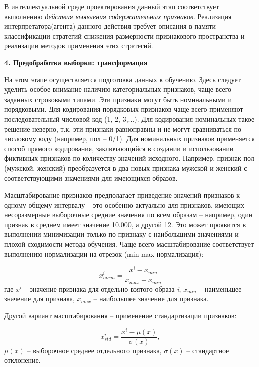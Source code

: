 В интеллектуальной среде проектирования данный этап соответствует выполнению \textit{действия выявления содержательных признаков}. Реализация интерпретатора(агента) данного действия требует описания в памяти классификации стратегий снижения размерности признакового пространства и реализации методов применения этих стратегий. 

\textbf{4. Предобработка выборки: трансформация}

На этом этапе осуществляется подготовка данных к обучению. 
Здесь следует уделить особое внимание наличию категориальных признаков, чаще всего заданных строковыми типами. Эти признаки могут быть номинальными и порядковыми. Для кодирования порядковых признаков чаще всего применяют последовательный числовой код (1, 2, 3,...). Для кодирования номинальных такое решение неверно, т.к. эти признаки равноправны и не могут сравниваться по числовому коду (например, пол -- 0/1). Для номинальных признаков применяется способ прямого кодирования, заключающийся в создании и использовании фиктивных признаков по количеству значений исходного. Например, признак пол (мужской, женский) преобразуется в два новых признака мужской и женский с соответствующими значениями для имеющихся образов.

Масштабирование признаков предполагает приведение значений признаков к одному общему интервалу -- это особенно актуально для признаков, имеющих несоразмерные выборочные средние значения по всем образам -- например, один признак в среднем имеет значение 10.000, а другой 12. Это может проявится в выполнении минимизации только по признаку с наибольшими значениями и плохой сходимости метода обучения. Чаще всего масштабирование соответствует выполнению нормализации на отрезок (min-max нормализация):

\begin{equation*}
	x_{norm}^i = \frac{x^i - x_{min}}{x_{max} - x_{min}}
\end{equation*}
где $x^i$ -- значение признака   для отдельно взятого образа \textit{i}, $x_{min}$ -- наименьшее значение для признака, $x_{max}$ -- наибольшее значение для признака.

Другой вариант масштабирования -- применение стандартизации признаков:

\begin{equation*}
	x_{std}^i = \frac{x^i - \mu(x)}{\sigma(x)},
\end{equation*}
$\mu(x)$ -- выборочное среднее отдельного признака, $\sigma(x)$ -- стандартное отклонение.

